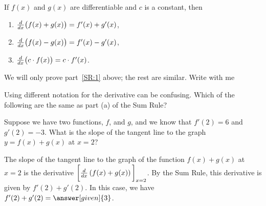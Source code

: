 \documentclass{ximera}
\begin{document}
\begin{theorem}\label{theorem:sum rule}
If $f(x)$ and $g(x)$ are differentiable and $c$ is a constant, then 
\begin{enumerate}
\item\label{SR:1} $\frac{d}{\mathop{}\!d x} \big( f(x) + g(x)\big) = f'(x) + g'(x)$,
\item $\frac{d}{\mathop{}\!d x} \big( f(x) - g(x)\big) = f'(x) - g'(x)$,
\item $\frac{d}{\mathop{}\!d x} \big(c\cdot f(x)\big) = c\cdot f'(x)$.
\end{enumerate}

\begin{explanation}
We will only prove part~\ref{SR:1} above; the rest are similar. Write with me
\begin{image}
\end{image}
\end{explanation}
\end{theorem}

\begin{question}
  Using different notation for the derivative can be confusing.  Which of the
  following are the same as part (a) of the Sum Rule?
  \begin{selectAll}
  \end{selectAll}
\end{question}


\begin{example}
  Suppose we have two functions, $f$, and $g$, and we know that $f'(2) = 6$ and $g'(2) = -3$.
  What is the slope of the tangent line to the graph $y=f(x) + g(x)$ at $x = 2$?
  \begin{explanation}
  	 The slope of the tangent line to the graph of the function $f(x) + g(x)$ at $x = 2$ is the derivative $ \bigg[ \frac{d}{\mathop{}\!d x} \left(f(x)+g(x)\right) \bigg]_{x=2}$. By the Sum Rule, this derivative is given by $f'(2) + g'(2)$.   In 
	this case, we have $f'(2) + g'(2) = \answer[given]{3}$.
  \end{explanation}
\end{example} 
\end{document}
